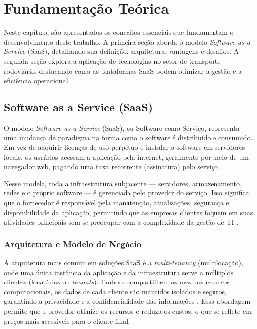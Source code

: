 \chapter{Fundamentação Teórica}
\label{cha:fundamentacao_teorica}

Neste capítulo, são apresentados os conceitos essenciais que fundamentam o desenvolvimento deste trabalho. A primeira seção aborda o modelo \textit{Software as a Service} (SaaS), detalhando sua definição, arquitetura, vantagens e desafios. A segunda seção explora a aplicação de tecnologias no setor de transporte rodoviário, destacando como as plataformas SaaS podem otimizar a gestão e a eficiência operacional.

\section{Software as a Service (SaaS)}

O modelo \textit{Software as a Service} (SaaS), ou Software como Serviço, representa uma mudança de paradigma na forma como o software é distribuído e consumido. Em vez de adquirir licenças de uso perpétuo e instalar o software em servidores locais, os usuários acessam a aplicação pela internet, geralmente por meio de um navegador web, pagando uma taxa recorrente (assinatura) pelo serviço \cite{salesforce2025saas}.

Nesse modelo, toda a infraestrutura subjacente — servidores, armazenamento, redes e o próprio software — é gerenciada pelo provedor do serviço. Isso significa que o fornecedor é responsável pela manutenção, atualizações, segurança e disponibilidade da aplicação, permitindo que as empresas clientes foquem em suas atividades principais sem se preocupar com a complexidade da gestão de TI \cite{microsoft2025azure}.

\subsection{Arquitetura e Modelo de Negócio}

A arquitetura mais comum em soluções SaaS é a \textit{multi-tenancy} (multilocação), onde uma única instância da aplicação e da infraestrutura serve a múltiplos clientes (locatários ou \textit{tenants}). Embora compartilhem os mesmos recursos computacionais, os dados de cada cliente são mantidos isolados e seguros, garantindo a privacidade e a confidencialidade das informações \cite{microsoft2025learn}. Essa abordagem permite que o provedor otimize os recursos e reduza os custos, o que se reflete em preços mais acessíveis para o cliente final.

